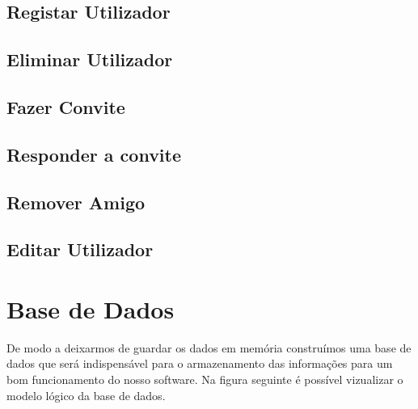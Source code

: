\documentclass[a4paper]{report}
\begin{document}
\section{Registar Utilizador}

\section{Eliminar Utilizador}

\section{Fazer Convite}

\section{Responder a convite}

\section{Remover Amigo}

\section{Editar Utilizador}

\chapter{Base de Dados}

De modo a deixarmos de guardar os dados em memória construímos uma base de dados
que será indispensável para o armazenamento das informações para um bom funcionamento
do nosso software.
Na figura seguinte é possível vizualizar o modelo lógico da base de dados.
\end{document}
